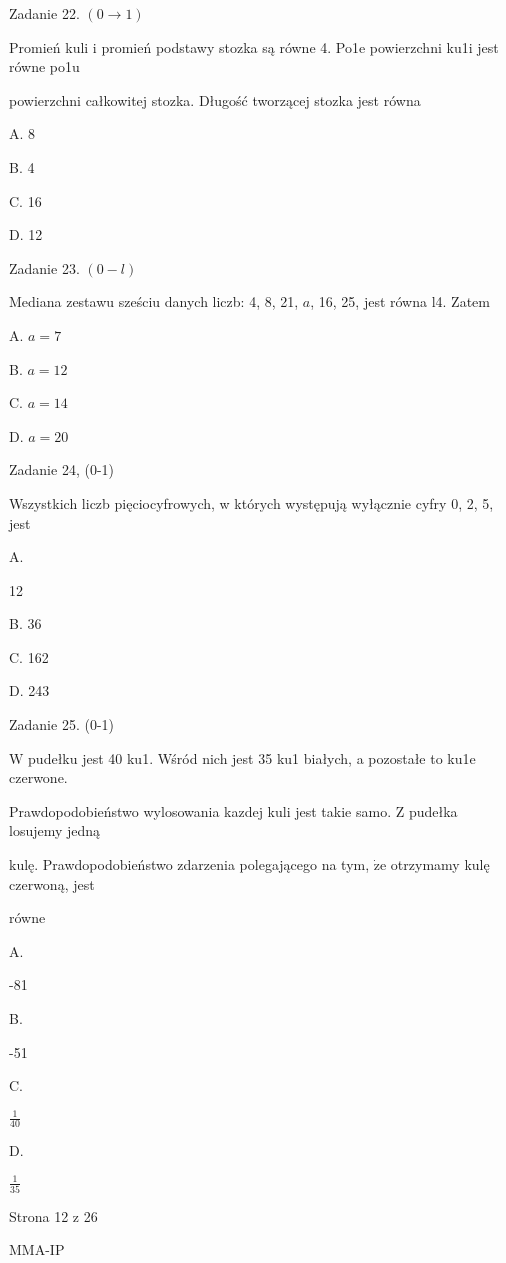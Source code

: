 \documentclass[a4paper,12pt]{article}
\begin{document}
Zadanie 22. $(0\rightarrow 1)$

Promień kuli i promień podstawy stozka są równe 4. Po1e powierzchni ku1i jest równe po1u

powierzchni całkowitej stozka. Długość tworzącej stozka jest równa

A. 8

B. 4

C. 16

D. 12

Zadanie 23. $(0-l)$

Mediana zestawu sześciu danych liczb: 4, 8, 21, $a$, 16, 25, jest równa l4. Zatem

A. $a=7$

B. $a=12$

C. $a=14$

D. $a=20$

Zadanie 24, (0-1)

Wszystkich liczb pięciocyfrowych, w których występują wyłącznie cyfry 0, 2, 5, jest

A.

12

B. 36

C. 162

D. 243

Zadanie 25. (0-1)

$\mathrm{W}$ pudełku jest 40 ku1. Wśród nich jest 35 ku1 białych, a pozostałe to ku1e czerwone.

Prawdopodobieństwo wylosowania kazdej kuli jest takie samo. $\mathrm{Z}$ pudełka losujemy jedną

kulę. Prawdopodobieństwo zdarzenia polegającego na tym, $\dot{\mathrm{z}}\mathrm{e}$ otrzymamy kulę czerwoną, jest

równe

A.

-81

B.

-51

C.

$\displaystyle \frac{1}{40}$

D.

$\displaystyle \frac{1}{35}$

Strona 12 z 26

MMA-IP
\end{document}
